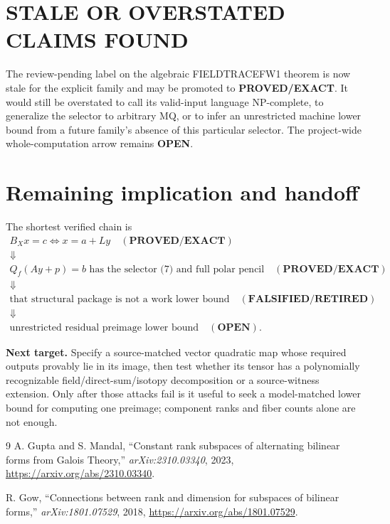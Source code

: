\documentclass[11pt]{article}
\newcommand{\EXACT}{\textbf{PROVED/EXACT}}
\newcommand{\OPEN}{\textbf{OPEN}}
\newcommand{\RET}{\textbf{FALSIFIED/RETIRED}}
\begin{document}
\section{STALE OR OVERSTATED CLAIMS FOUND}
The review-pending label on the algebraic FIELDTRACEFW1 theorem is now stale
for the explicit family and may be promoted to \EXACT{}.  It would still be
overstated to call its valid-input language NP-complete, to generalize the
selector to arbitrary MQ, or to infer an unrestricted machine lower bound
from a future family's absence of this particular selector.  The project-wide
whole-computation arrow remains \OPEN{}.

\section{Remaining implication and handoff}
The shortest verified chain is
\[
\begin{array}{c}
B_Xx=c\Longleftrightarrow x=a+Ly\quad(\EXACT)\\
\Downarrow\\
Q_f(Ay+p)=b\text{ has the selector (7) and full polar pencil}\quad(\EXACT)\\
\Downarrow\\
\text{that structural package is not a work lower bound}\quad(\RET)\\
\Downarrow\\
\text{unrestricted residual preimage lower bound}\quad(\OPEN).
\end{array}
\]

\textbf{Next target.}  Specify a source-matched vector quadratic map whose
required outputs provably lie in its image, then test whether its tensor has
a polynomially recognizable field/direct-sum/isotopy decomposition or a
source-witness extension.  Only after those attacks fail is it useful to seek
a model-matched lower bound for computing one preimage; component ranks and
fiber counts alone are not enough.

\begin{thebibliography}{9}
A. Gupta and S. Mandal,
``Constant rank subspaces of alternating bilinear forms from Galois Theory,''
\emph{arXiv:2310.03340}, 2023,
\url{https://arxiv.org/abs/2310.03340}.

R. Gow,
``Connections between rank and dimension for subspaces of bilinear forms,''
\emph{arXiv:1801.07529}, 2018,
\url{https://arxiv.org/abs/1801.07529}.
\end{thebibliography}
\end{document}
